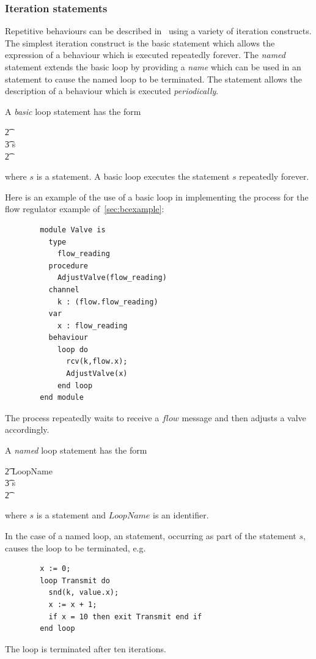 \subsubsection{Iteration statements}
Repetitive behaviours can be described in \candle\ using a variety
of iteration constructs. The simplest iteration construct is the 
basic  statement which allows the expression of a behaviour
which is executed repeatedly forever. The \emph{named} 
statement extends the basic loop by providing a \emph{name} which can
be used in an  statement to cause the named loop to be terminated.
The  statement allows the description of a behaviour which is
executed \emph{periodically}.

A \emph{basic} loop statement has the form
\begin{zed}
\t2      \\
\t3          s \\
\t2      
\end{zed}
where $s$ is a statement. A basic loop executes the statement $s$
repeatedly forever.

Here is an example of the use of a basic
loop in implementing the  process for the flow regulator
example of~\Sec\ref{sec:bcexample}: 
\begin{verbatim}
        module Valve is
          type
            flow_reading
          procedure
            AdjustValve(flow_reading)
          channel
            k : (flow.flow_reading)
          var
            x : flow_reading
          behaviour
            loop do
              rcv(k,flow.x);
              AdjustValve(x)
            end loop
        end module
\end{verbatim}
The process repeatedly waits to receive a $flow$ message and then
adjusts a valve accordingly.

A \emph{named} loop statement has the form
\begin{zed}  
\t2      LoopName  \\
\t3          s \\
\t2     
\end{zed}
where $s$ is a statement and $LoopName$ is an identifier. 

In the case of a named loop, an 
statement, occurring as part of the statement $s$, causes the loop
to be terminated, e.g.
\begin{verbatim}
        x := 0;
        loop Transmit do
          snd(k, value.x);
          x := x + 1;
          if x = 10 then exit Transmit end if
        end loop
\end{verbatim}
The  loop is terminated after ten iterations.

